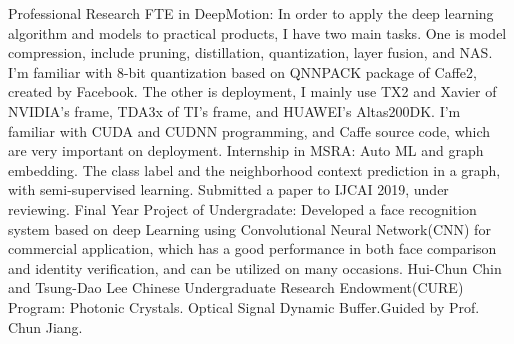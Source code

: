 
\begin{rubric}{Professional Research}
	 FTE in DeepMotion: In order to apply the deep learning algorithm and models to practical products, I have two main tasks. One is model compression, include pruning, distillation, quantization, layer fusion, and NAS. I'm familiar with 8-bit quantization based on QNNPACK package of Caffe2, created by Facebook. The other is deployment, I mainly use TX2 and Xavier of NVIDIA’s frame, TDA3x of TI’s frame, and HUAWEI's Altas200DK. I'm familiar with CUDA and CUDNN programming, and Caffe source code, which are very important on deployment.
	 Internship in MSRA: Auto ML and graph embedding. The class label and the neighborhood context
		prediction in a graph, with semi-supervised learning. Submitted a paper to IJCAI 2019, under reviewing.
	 Final Year Project of Undergradate:
		Developed a face recognition system based on deep Learning using Convolutional Neural Network(CNN) for
		commercial application, which has a good performance in both face comparison and identity verification, and can be utilized on many occasions.
        Hui-Chun Chin and Tsung-Dao Lee Chinese Undergraduate Research Endowment(CURE) Program: Photonic Crystals. Optical Signal Dynamic Buffer.Guided by Prof. Chun Jiang.
\end{rubric}
